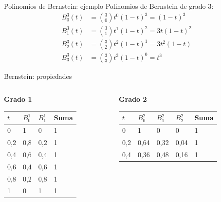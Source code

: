 \documentclass[main.tex]{subfiles}
\begin{document}
\begin{frame}[t]{Polinomios de Bernstein: ejemplo}
Polinomios de Bernstein de grado 3:\[\begin{aligned}B_0^3(t)&=\binom{3}{0}t^{0}(1-t)^{3}=(1-t)^3\\[3mm]B_1^3(t)&=\binom{3}{1}t^{1}(1-t)^{2}=3t(1-t)^2\\[3mm]B_2^3(t)&=\binom{3}{2}t^{2}(1-t)^{1}=3t^2(1-t)\\[3mm]B_3^3(t)&=\binom{3}{3}t^{3}(1-t)^{0}=t^3\end{aligned}\]
\end{frame}

\begin{frame}[t]{Bernstein: propiedades}
\begin{columns}[T]\begin{column}{.48\textwidth}\textbf{Grado 1}\begingroup\scriptsize\setlength{\tabcolsep}{2pt}\begin{center}\begin{tabular}{|C{.19\textwidth}|C{.19\textwidth}|C{.19\textwidth}|C{.19\textwidth}|}\hline
$t$ & $B_0^1$ & $B_1^1$ & Suma\\\hline
\rule[-1.5mm]{0pt}{3.7mm}0 & 1 & 0 & 1\\\hline
\rule[-1.5mm]{0pt}{3.7mm}0,2 & 0,8 & 0,2 & 1\\\hline
\rule[-1.5mm]{0pt}{3.7mm}0,4 & 0,6 & 0,4 & 1\\\hline
\rule[-1.5mm]{0pt}{3.7mm}0,6 & 0,4 & 0,6 & 1\\\hline
\rule[-1.5mm]{0pt}{3.7mm}0,8 & 0,2 & 0,8 & 1\\\hline
\rule[-1.5mm]{0pt}{3.7mm}1 & 0 & 1 & 1\\\hline
\end{tabular}\end{center}\endgroup\end{column}\begin{column}{.48\textwidth}\textbf{Grado 2}\begingroup\scriptsize\setlength{\tabcolsep}{2pt}\begin{center}\begin{tabular}{|C{.155\textwidth}|C{.155\textwidth}|C{.155\textwidth}|C{.155\textwidth}|C{.155\textwidth}|}\hline
$t$ & $B_0^2$ & $B_1^2$ & $B_2^2$ & Suma\\\hline
\rule[-1.5mm]{0pt}{3.7mm}0 & 1 & 0 & 0 & 1\\\hline
\rule[-1.5mm]{0pt}{3.7mm}0,2 & 0,64 & 0,32 & 0,04 & 1\\\hline
\rule[-1.5mm]{0pt}{3.7mm}0,4 & 0,36 & 0,48 & 0,16 & 1\\\hline

\end{tabular}
\end{center}
\end{column}
\end{columns}
\end{frame}
\end{document}
